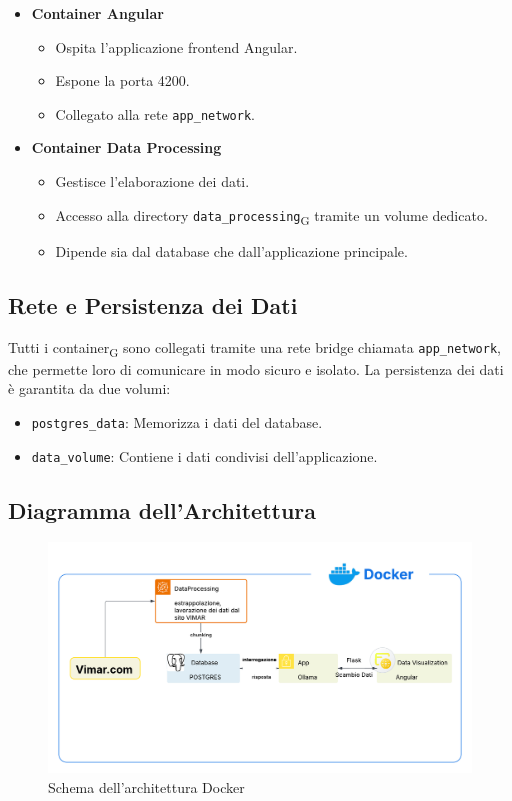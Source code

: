 \begin{itemize}
    \item \textbf{Container Angular}
    \begin{itemize}
        \item Ospita l'applicazione frontend Angular.
        \item Espone la porta 4200.
        \item Collegato alla rete \texttt{app\_network}.
    \end{itemize}

    \item \textbf{Container Data Processing}
    \begin{itemize}
        \item Gestisce l'elaborazione dei dati.
        \item Accesso alla directory \texttt{data\_processing}\textsubscript{G} tramite un volume dedicato.
        \item Dipende sia dal database che dall'applicazione principale.
    \end{itemize}
\end{itemize}

\subsection{Rete e Persistenza dei Dati}

Tutti i container\textsubscript{G} sono collegati tramite una rete bridge chiamata \texttt{app\_network}, che permette loro di comunicare in modo sicuro e isolato. La persistenza dei dati è garantita da due volumi:

\begin{itemize}
    \item \texttt{postgres\_data}: Memorizza i dati del database.
    \item \texttt{data\_volume}: Contiene i dati condivisi dell'applicazione.
\end{itemize}

\subsection{Diagramma dell'Architettura}
\begin{figure}[H]
    \centering
    \includegraphics[width=\textwidth]{images/esagonale.png}
    \caption{Schema dell'architettura Docker}
\end{figure}

